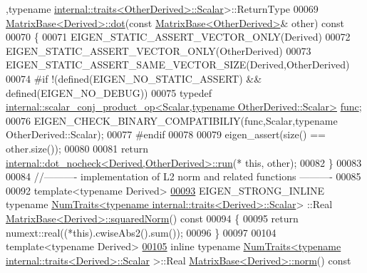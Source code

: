 \begin{DoxyCode}
      ,\textcolor{keyword}{typename} \hyperlink{struct_eigen_1_1internal_1_1traits}{internal::traits<OtherDerived>::Scalar}>::ReturnType
00069 \hyperlink{group___core___module_class_eigen_1_1_matrix_base}{MatrixBase<Derived>::dot}(\textcolor{keyword}{const} \hyperlink{group___core___module_class_eigen_1_1_matrix_base}{MatrixBase<OtherDerived>}& 
      other)\textcolor{keyword}{ const}
00070 \textcolor{keyword}{}\{
00071   EIGEN\_STATIC\_ASSERT\_VECTOR\_ONLY(Derived)
00072   EIGEN\_STATIC\_ASSERT\_VECTOR\_ONLY(OtherDerived)
00073   EIGEN\_STATIC\_ASSERT\_SAME\_VECTOR\_SIZE(Derived,OtherDerived)
00074 \textcolor{preprocessor}{#if !(defined(EIGEN\_NO\_STATIC\_ASSERT) && defined(EIGEN\_NO\_DEBUG))}
00075   \textcolor{keyword}{typedef} \hyperlink{struct_eigen_1_1internal_1_1scalar__conj__product__op}{internal::scalar\_conj\_product\_op<Scalar,typename OtherDerived::Scalar>}
       \hyperlink{structfunc}{func};
00076   EIGEN\_CHECK\_BINARY\_COMPATIBILIY(func,Scalar,\textcolor{keyword}{typename} OtherDerived::Scalar);
00077 \textcolor{preprocessor}{#endif}
00078   
00079   eigen\_assert(size() == other.size());
00080 
00081   \textcolor{keywordflow}{return} \hyperlink{struct_eigen_1_1internal_1_1dot__nocheck}{internal::dot\_nocheck<Derived,OtherDerived>::run}(*\textcolor{keyword}{
      this}, other);
00082 \}
00083 
00084 \textcolor{comment}{//---------- implementation of L2 norm and related functions ----------}
00085 
00092 \textcolor{keyword}{template}<\textcolor{keyword}{typename} Derived>
\hyperlink{group___core___module_a8782faeb21e43908cdce47cec06fba23}{00093} EIGEN\_STRONG\_INLINE \textcolor{keyword}{typename} 
      \hyperlink{group___core___module_struct_eigen_1_1_num_traits}{NumTraits<typename internal::traits<Derived>::Scalar}>
      ::Real \hyperlink{group___core___module_a8782faeb21e43908cdce47cec06fba23}{MatrixBase<Derived>::squaredNorm}()\textcolor{keyword}{ const}
00094 \textcolor{keyword}{}\{
00095   \textcolor{keywordflow}{return} numext::real((*this).cwiseAbs2().sum());
00096 \}
00097 
00104 \textcolor{keyword}{template}<\textcolor{keyword}{typename} Derived>
\hyperlink{group___core___module_a196c4ec3c8ffdf5bda45d0f617154975}{00105} \textcolor{keyword}{inline} \textcolor{keyword}{typename} \hyperlink{group___core___module_struct_eigen_1_1_num_traits}{NumTraits<typename internal::traits<Derived>::Scalar}
      >::Real \hyperlink{group___core___module_a196c4ec3c8ffdf5bda45d0f617154975}{MatrixBase<Derived>::norm}()\textcolor{keyword}{ const}

\end{DoxyCode}
